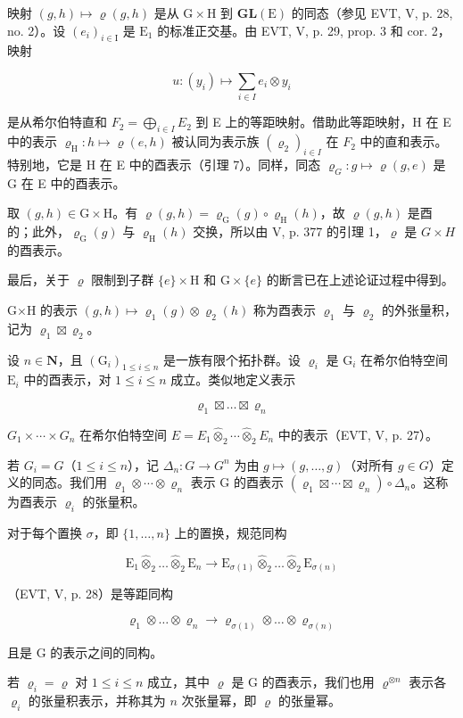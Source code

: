 映射 \((g,h)\mapsto\varrho(g,h)\) 是从 \(\mathrm{G}\times\mathrm{H}\) 到 \(\mathbf{GL}(\mathrm{E})\) 的同态（参见 EVT, V, p. 28, no. 2）。设 \((e_{i})_{i\in\mathrm{I}}\) 是 \(\mathrm{E}_{1}\) 的标准正交基。由 EVT, V, p. 29, prop. 3 和 cor. 2，映射

\[
u \colon (y _ {i}) \mapsto \sum_ {i \in I} e _ {i} \otimes y _ {i}
\]

是从希尔伯特直和 \(F_{2} = \bigoplus_{i \in I} E_{2}\) 到 E 上的等距映射。借助此等距映射，H 在 E 中的表示 \(\varrho_{\mathrm{H}} \colon h \mapsto \varrho(e, h)\) 被认同为表示族 \((\varrho_{2})_{i\in I}\) 在 \(F_{2}\) 中的直和表示。特别地，它是 H 在 E 中的酉表示（引理 7）。同样，同态 \(\varrho_{G}: g \mapsto \varrho(g,e)\) 是 G 在 E 中的酉表示。

取 \((g,h)\in\mathrm{G}\times\mathrm{H}\)。有 \(\varrho(g,h)=\varrho_{\mathrm{G}}(g)\circ\varrho_{\mathrm{H}}(h)\)，故 \(\varrho(g,h)\) 是酉的；此外，\(\varrho_{\mathrm{G}}(g)\) 与 \(\varrho_{\mathrm{H}}(h)\) 交换，所以由 V, p. 377 的引理 1，\(\varrho\) 是 \(G\times H\) 的酉表示。

最后，关于 \(\varrho\) 限制到子群 \(\{e\} \times \mathrm{H}\) 和 \(\mathrm{G} \times \{e\}\) 的断言已在上述论证过程中得到。

G×H 的表示 \((g,h)\mapsto\varrho_{1}(g)\otimes\varrho_{2}(h)\) 称为酉表示 \(\varrho_{1}\) 与 \(\varrho_{2}\) 的外张量积，记为 \(\varrho_{1}\boxtimes\varrho_{2}\)。

设 \(n \in \mathbf{N}\)，且 \((\mathrm{G}_i)_{1 \leqslant i \leqslant n}\) 是一族有限个拓扑群。设 \(\varrho_i\) 是 \(\mathrm{G}_i\) 在希尔伯特空间 \(\mathrm{E}_i\) 中的酉表示，对 \(1 \leqslant i \leqslant n\) 成立。类似地定义表示

\[
\varrho_ {1} \boxtimes \dots \boxtimes \varrho_ {n}
\]

\(G_{1} \times \cdots \times G_{n}\) 在希尔伯特空间 \(E = E_{1} \widehat{\otimes}_{2} \cdots \widehat{\otimes}_{2} E_{n}\) 中的表示（EVT, V, p. 27）。

若 \(G_{i} = G\)（\(1 \leqslant i \leqslant n\)），记 \(\Delta_{n}: G \to G^{n}\) 为由 \(g \mapsto (g, \ldots, g)\)（对所有 \(g \in G\)）定义的同态。我们用 \(\varrho_{1} \otimes \cdots \otimes \varrho_{n}\) 表示 G 的酉表示 \((\varrho_{1} \boxtimes \cdots \boxtimes \varrho_{n}) \circ \Delta_{n}\)。这称为酉表示 \(\varrho_{i}\) 的张量积。

对于每个置换 \(\sigma\)，即 \(\{1,\ldots,n\}\) 上的置换，规范同构

\[
\mathrm{E} _ {1} \widehat {\otimes} _ {2} \dots \widehat {\otimes} _ {2} \mathrm{E} _ {n} \rightarrow \mathrm{E} _ {\sigma (1)} \widehat {\otimes} _ {2} \dots \widehat {\otimes} _ {2} \mathrm{E} _ {\sigma (n)}
\]

（EVT, V, p. 28）是等距同构

\[
\varrho_ {1} \otimes \dots \otimes \varrho_ {n} \rightarrow \varrho_ {\sigma (1)} \otimes \dots \otimes \varrho_ {\sigma (n)}
\]

且是 G 的表示之间的同构。

若 \(\varrho_{i}=\varrho\) 对 \(1\leqslant i\leqslant n\) 成立，其中 \(\varrho\) 是 G 的酉表示，我们也用 \(\varrho^{\otimes n}\) 表示各 \(\varrho_{i}\) 的张量积表示，并称其为 \(n\) 次张量幂，即 \(\varrho\) 的张量幂。


